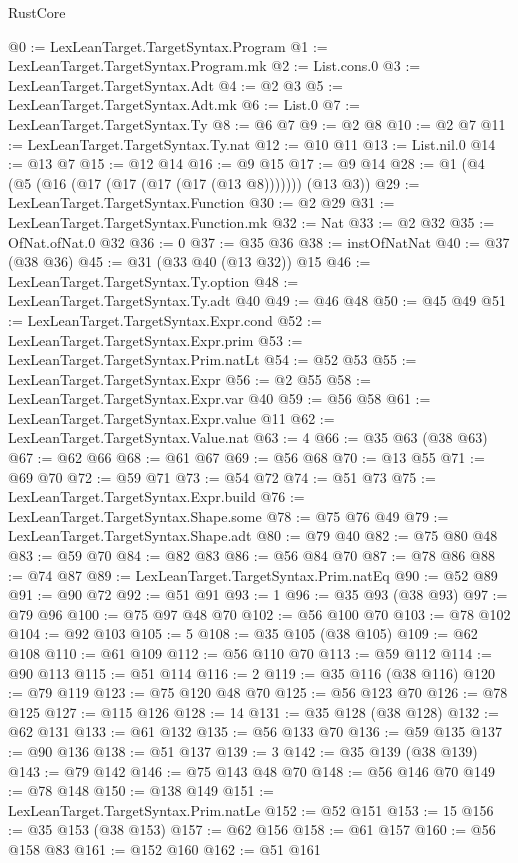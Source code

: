 \begin{lexlean}{RustCore}
\begin{coremodule}
@0 := LexLeanTarget.TargetSyntax.Program
@1 := LexLeanTarget.TargetSyntax.Program.mk
@2 := List.cons.{0}
@3 := LexLeanTarget.TargetSyntax.Adt
@4 := @2 @3
@5 := LexLeanTarget.TargetSyntax.Adt.mk
@6 := List.{0}
@7 := LexLeanTarget.TargetSyntax.Ty
@8 := @6 @7
@9 := @2 @8
@10 := @2 @7
@11 := LexLeanTarget.TargetSyntax.Ty.nat
@12 := @10 @11
@13 := List.nil.{0}
@14 := @13 @7
@15 := @12 @14
@16 := @9 @15
@17 := @9 @14
@28 := @1 (@4 (@5 (@16 (@17 (@17 (@17 (@17 (@13 @8))))))) (@13 @3))
@29 := LexLeanTarget.TargetSyntax.Function
@30 := @2 @29
@31 := LexLeanTarget.TargetSyntax.Function.mk
@32 := Nat
@33 := @2 @32
@35 := OfNat.ofNat.{0} @32
@36 := 0
@37 := @35 @36
@38 := instOfNatNat
@40 := @37 (@38 @36)
@45 := @31 (@33 @40 (@13 @32)) @15
@46 := LexLeanTarget.TargetSyntax.Ty.option
@48 := LexLeanTarget.TargetSyntax.Ty.adt @40
@49 := @46 @48
@50 := @45 @49
@51 := LexLeanTarget.TargetSyntax.Expr.cond
@52 := LexLeanTarget.TargetSyntax.Expr.prim
@53 := LexLeanTarget.TargetSyntax.Prim.natLt
@54 := @52 @53
@55 := LexLeanTarget.TargetSyntax.Expr
@56 := @2 @55
@58 := LexLeanTarget.TargetSyntax.Expr.var @40
@59 := @56 @58
@61 := LexLeanTarget.TargetSyntax.Expr.value @11
@62 := LexLeanTarget.TargetSyntax.Value.nat
@63 := 4
@66 := @35 @63 (@38 @63)
@67 := @62 @66
@68 := @61 @67
@69 := @56 @68
@70 := @13 @55
@71 := @69 @70
@72 := @59 @71
@73 := @54 @72
@74 := @51 @73
@75 := LexLeanTarget.TargetSyntax.Expr.build
@76 := LexLeanTarget.TargetSyntax.Shape.some
@78 := @75 @76 @49
@79 := LexLeanTarget.TargetSyntax.Shape.adt
@80 := @79 @40
@82 := @75 @80 @48
@83 := @59 @70
@84 := @82 @83
@86 := @56 @84 @70
@87 := @78 @86
@88 := @74 @87
@89 := LexLeanTarget.TargetSyntax.Prim.natEq
@90 := @52 @89
@91 := @90 @72
@92 := @51 @91
@93 := 1
@96 := @35 @93 (@38 @93)
@97 := @79 @96
@100 := @75 @97 @48 @70
@102 := @56 @100 @70
@103 := @78 @102
@104 := @92 @103
@105 := 5
@108 := @35 @105 (@38 @105)
@109 := @62 @108
@110 := @61 @109
@112 := @56 @110 @70
@113 := @59 @112
@114 := @90 @113
@115 := @51 @114
@116 := 2
@119 := @35 @116 (@38 @116)
@120 := @79 @119
@123 := @75 @120 @48 @70
@125 := @56 @123 @70
@126 := @78 @125
@127 := @115 @126
@128 := 14
@131 := @35 @128 (@38 @128)
@132 := @62 @131
@133 := @61 @132
@135 := @56 @133 @70
@136 := @59 @135
@137 := @90 @136
@138 := @51 @137
@139 := 3
@142 := @35 @139 (@38 @139)
@143 := @79 @142
@146 := @75 @143 @48 @70
@148 := @56 @146 @70
@149 := @78 @148
@150 := @138 @149
@151 := LexLeanTarget.TargetSyntax.Prim.natLe
@152 := @52 @151
@153 := 15
@156 := @35 @153 (@38 @153)
@157 := @62 @156
@158 := @61 @157
@160 := @56 @158 @83
@161 := @152 @160
@162 := @51 @161

\end{coremodule}
\end{lexlean}
